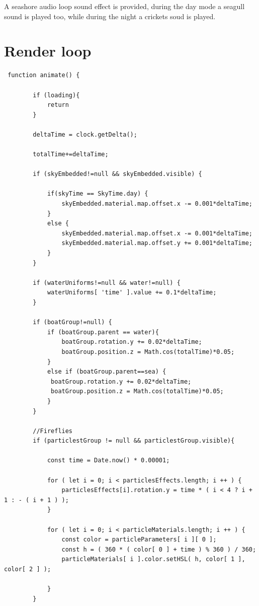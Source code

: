 \documentclass[10pt,a4paper]{article}
\begin{document}
A seashore audio loop sound effect is provided, during the day mode a seagull sound is played too, while during the night a crickets soud is played.

\section{Render loop}

\begin{verbatim}
 function animate() {

        if (loading){
            return
        }

        deltaTime = clock.getDelta();
     
        totalTime+=deltaTime;

        if (skyEmbedded!=null && skyEmbedded.visible) {

            if(skyTime == SkyTime.day) {
                skyEmbedded.material.map.offset.x -= 0.001*deltaTime; 
            }
            else {
                skyEmbedded.material.map.offset.x -= 0.001*deltaTime; 
                skyEmbedded.material.map.offset.y += 0.001*deltaTime; 
            }
        }
        
        if (waterUniforms!=null && water!=null) {
            waterUniforms[ 'time' ].value += 0.1*deltaTime;
        }

        if (boatGroup!=null) {
            if (boatGroup.parent == water){
                boatGroup.rotation.y += 0.02*deltaTime;
                boatGroup.position.z = Math.cos(totalTime)*0.05;
            }
            else if (boatGroup.parent==sea) {
             boatGroup.rotation.y += 0.02*deltaTime;
             boatGroup.position.z = Math.cos(totalTime)*0.05;
            } 
        }

        //Fireflies
        if (particlestGroup != null && particlestGroup.visible){

            const time = Date.now() * 0.00001;
            
            for ( let i = 0; i < particlesEffects.length; i ++ ) {
                particlesEffects[i].rotation.y = time * ( i < 4 ? i + 1 : - ( i + 1 ) );
            }

            for ( let i = 0; i < particleMaterials.length; i ++ ) {
                const color = particleParameters[ i ][ 0 ];
                const h = ( 360 * ( color[ 0 ] + time ) % 360 ) / 360;
                particleMaterials[ i ].color.setHSL( h, color[ 1 ], color[ 2 ] );

            }
        }


\end{verbatim}
\end{document}
